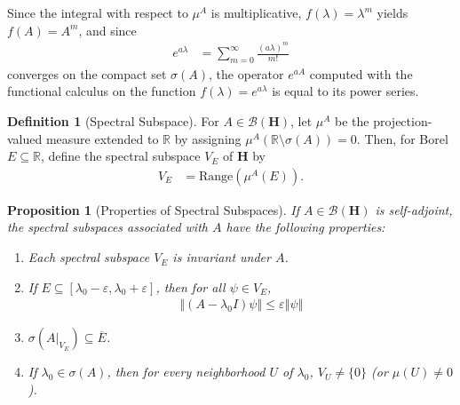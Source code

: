 \documentclass[12pt]{extarticle}
\newcommand{\R}{\mathbb{R}}
\newcommand{\norm}[1]{\left\Vert #1\right\Vert}
\theoremstyle{plain}
\newtheorem*{proposition}{Proposition}%
\theoremstyle{definition}
\newtheorem*{definition}{Definition}
\theoremstyle{remark}
\begin{document}
  Since the integral with respect to $\mu^{A}$ is multiplicative, $f(\lambda) = \lambda^{m}$ yields $f(A) = A^{m}$, and since
  \begin{align*}
    e^{a\lambda} &= \sum_{m=0}^{\infty}\frac{(a\lambda)^{m}}{m!}
  \end{align*}
  converges on the compact set $\sigma(A)$, the operator $e^{aA}$ computed with the functional calculus on the function $f(\lambda) = e^{a\lambda}$ is equal to its power series.
  \begin{definition}[Spectral Subspace]
    For $A\in \mathcal{B}\left(\mathbf{H}\right)$, let $\mu^{A}$ be the projection-valued measure extended to $\R$ by assigning $\mu^{A}\left(\R\setminus \sigma(A)\right) = 0$. Then, for Borel $E\subseteq \R$, define the spectral subspace $V_E$ of $\mathbf{H}$ by
    \begin{align*}
      V_E &= \text{Range}\left(\mu^{A}\left(E\right)\right).
    \end{align*}
  \end{definition}
  \begin{proposition}[Properties of Spectral Subspaces]
    If $A\in \mathcal{B}\left(\mathbf{H}\right)$ is self-adjoint, the spectral subspaces associated with $A$ have the following properties:
    \begin{enumerate}[(1)]
      \item Each spectral subspace $V_E$ is invariant under $A$.
      \item If $E\subseteq [\lambda_0 - \varepsilon, \lambda_0 + \varepsilon]$, then for all $\psi \in V_E$,
        \begin{align*}
          \norm{\left(A-\lambda_0I\right)\psi}\leq \varepsilon \norm{\psi}
        \end{align*}
      \item $\displaystyle \sigma\left(A\rvert_{V_E}\right)\subseteq \overline{E}$.
      \item If $\lambda_0 \in \sigma(A)$, then for every neighborhood $U$ of $\lambda_0$, $V_U \neq \{0\}$ (or $\mu(U)\neq 0$).
    \end{enumerate}
  \end{proposition}
\end{document}
